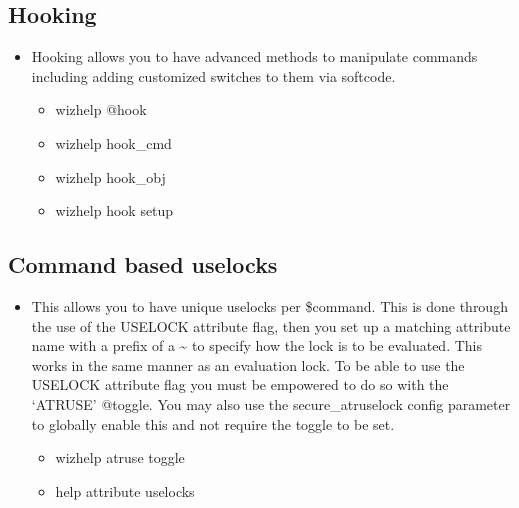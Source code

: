 \documentclass[letterpaper,10pt,english]{sphinxmanual}
\begin{document}
\subsection{Hooking}
\label{\detokenize{features:hooking}}\begin{itemize}
\item {} 
\sphinxAtStartPar
Hooking allows you to have advanced methods to manipulate commands
including adding customized switches to them via softcode.
\begin{itemize}
\item {} 
\sphinxAtStartPar
wizhelp @hook

\item {} 
\sphinxAtStartPar
wizhelp hook\_cmd

\item {} 
\sphinxAtStartPar
wizhelp hook\_obj

\item {} 
\sphinxAtStartPar
wizhelp hook setup

\end{itemize}

\end{itemize}


\subsection{Command based uselocks}
\label{\detokenize{features:command-based-uselocks}}\begin{itemize}
\item {} 
\sphinxAtStartPar
This allows you to have unique uselocks per \$command.  This is done
through the use of the USELOCK attribute flag, then you set up
a matching attribute name with a prefix of a \textasciitilde{} to specify how
the lock is to be evaluated.  This works in the same manner
as an evaluation lock.  To be able to use the USELOCK attribute flag
you must be empowered to do so with the ‘ATRUSE’ @toggle.  You may
also use the secure\_atruselock config parameter to globally enable
this and not require the toggle to be set.
\begin{itemize}
\item {} 
\sphinxAtStartPar
wizhelp atruse toggle

\item {} 
\sphinxAtStartPar
help attribute uselocks

\end{itemize}

\end{itemize}
\end{document}
